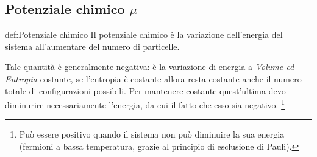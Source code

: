 \subsection{Potenziale chimico $\mu$}%
\begin{defn}{def:Potenziale chimico}
	Il potenziale chimico è la variazione dell'energia del sistema all'aumentare del numero di particelle.
\end{defn}
Tale quantità è generalmente negativa: è la variazione di energia a \textit{Volume ed Entropia} costante, se l'entropia è costante allora resta costante anche il numero totale di configurazioni possibili. Per mantenere costante quest'ultima devo diminurire necessariamente l'energia, da cui il fatto che esso sia negativo.
\footnote{Può essere positivo quando il sistema non può diminuire la sua energia (fermioni a bassa temperatura, grazie al principio di esclusione di Pauli).}
